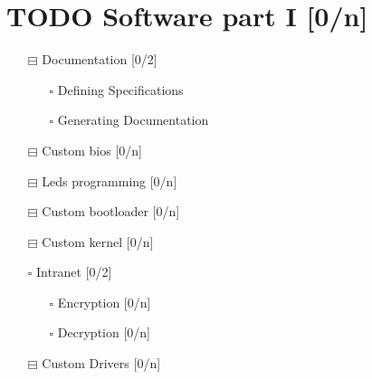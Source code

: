 \documentclass[11pt]{article}
\begin{document}
\section{{\bfseries\sffamily TODO} Software part I [0/n]}
\label{sec:org9788499}
\begin{itemize}
\item[{$\boxminus$}] Documentation [0/2]
\begin{itemize}
\item[{$\square$}] Defining Specifications
\item[{$\square$}] Generating Documentation
\end{itemize}
\item[{$\boxminus$}] Custom bios [0/n]
\item[{$\boxminus$}] Leds programming [0/n]
\item[{$\boxminus$}] Custom bootloader [0/n]
\item[{$\boxminus$}] Custom kernel [0/n]
\item[{$\square$}] Intranet [0/2]
\begin{itemize}
\item[{$\square$}] Encryption [0/n]
\item[{$\square$}] Decryption [0/n]
\end{itemize}
\item[{$\boxminus$}] Custom Drivers [0/n]
\end{itemize}
\end{document}
